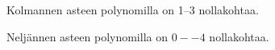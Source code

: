 \begin{esimerkki} Kolmannen asteen polynomilla on 1--3 nollakohtaa.

\begin{lukusuora}{-2.5}{3}{3.6}
\lukusuoraisobbox
{}
\end{lukusuora}
\begin{lukusuora}{-2.8}{2.5}{3.6}
\lukusuoraisobbox
{}
\end{lukusuora}
\begin{lukusuora}{-2}{2}{3.6}
\lukusuoraisobbox
{}
\end{lukusuora}
\end{esimerkki}


\begin{esimerkki} Neljännen asteen polynomilla on $0--4$ nollakohtaa.
\begin{lukusuora}{-4}{4}{3.6}
\end{lukusuora}
\begin{lukusuora}{-4}{4}{3.6}
\end{lukusuora}
\begin{lukusuora}{-4}{4}{3.6}
\end{lukusuora}

\begin{lukusuora}{-4}{4}{3.6}
\end{lukusuora}
\begin{lukusuora}{-2.8}{2.8}{3.6}
\end{lukusuora}
\end{esimerkki}

